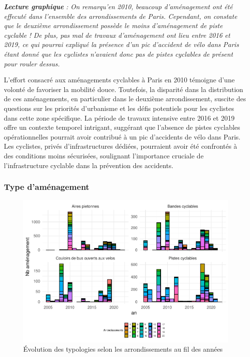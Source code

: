 \documentclass[french,]{compterendu}
\theoremstyle{urcastyle}
\theoremstyle{remark}
\begin{document}
\emph{\textbf{Lecture graphique} : On remarqu'en 2010, beaucoup d'aménagement ont été effecuté dans l'ensemble des arrondissements de Paris. Cependant, on constate que le deuxième arrondissement possède le moins d'aménagement de piste cyclable ! De plus, pas mal de travaux d'aménagement ont lieu entre 2016 et 2019, ce qui pourrai expliqué la présence d'un pic d'accident de vélo dans Paris étant donné que les cyclistes n'avaient donc pas de pistes cyclables de présent pour rouler dessus.}

L'effort consacré aux aménagements cyclables à Paris en 2010 témoigne d'une volonté de favoriser la mobilité douce. Toutefois, la disparité dans la distribution de ces aménagements, en particulier dans le deuxième arrondissement, suscite des questions sur les priorités d'urbanisme et les défis potentiels pour les cyclistes dans cette zone spécifique.
La période de travaux intensive entre 2016 et 2019 offre un contexte temporel intrigant, suggérant que l'absence de pistes cyclables opérationnelles pourrait avoir contribué à un pic d'accidents de vélo dans Paris. Les cyclistes, privés d'infrastructures dédiées, pourraient avoir été confrontés à des conditions moins sécurisées, soulignant l'importance cruciale de l'infrastructure cyclable dans la prévention des accidents.

\hypertarget{type-damuxe9nagement}{%
\subsubsection{Type d'aménagement}\label{type-damuxe9nagement}}

\begin{figure}[H]

{\centering \includegraphics[width=0.9\linewidth]{Rapport_ADD_LEO-GABET_files/figure-latex/arrPARISTypo-1} 

}

\caption{Évolution des typologies selon les arrondissements au fil des années}\label{fig:arrPARISTypo}
\end{figure}
\end{document}

